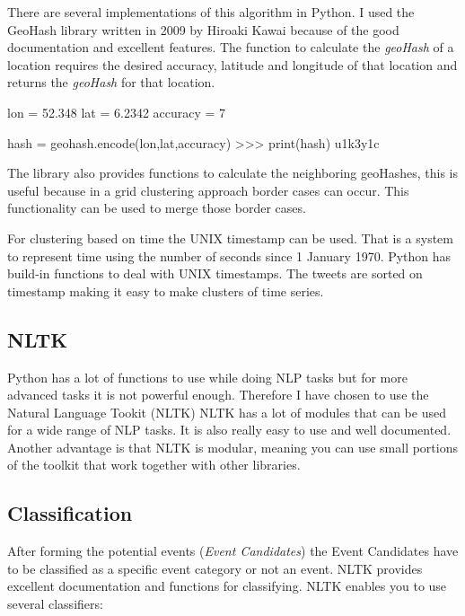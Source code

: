 \documentclass[
10pt, %
a4paper, %
oneside, %
headinclude,footinclude, %
BCOR5mm, %
]{scrartcl}
\begin{document}
\newpage
There are several implementations of this algorithm in Python. I used the GeoHash library written in 2009 by Hiroaki Kawai\cite{geohash-module} because of the good documentation and excellent features. The function to calculate the \textit{geoHash} of a location requires the desired accuracy, latitude and longitude of that location and returns the \textit{geoHash} for that location. 

\begin{python}
lon = 52.348
lat = 6.2342
accuracy = 7

hash = geohash.encode(lon,lat,accuracy)
>>> print(hash)
u1k3y1c
\end{python}

The library also provides functions to calculate the neighboring geoHashes, this is useful because in a grid clustering approach border cases can occur.  This  functionality can be used to merge those border cases. \newline

For clustering based on time the UNIX timestamp can be used. That is a system to represent time using the number of seconds since 1 January 1970. Python has build-in functions to deal with UNIX timestamps. The tweets are sorted on timestamp making it easy to make clusters of time series.


\subsection{NLTK}
Python has a lot of functions to use while doing NLP tasks but for more advanced tasks it is not powerful enough. Therefore I have chosen to use the Natural Language Tookit (NLTK)\cite{NTLK-website}%
NLTK has a lot of modules that can be used for a wide range of NLP tasks. It is also really easy to use and well documented. Another advantage is that NLTK is modular, meaning you can use small portions of the toolkit that work together with other libraries. 


\subsection{Classification}
After forming the potential events (\textit{Event Candidates}) the Event Candidates have to be classified as a specific event category or not an event.  NLTK provides excellent documentation and functions for classifying. \newline  NLTK enables you to use several classifiers:
\end{document}
